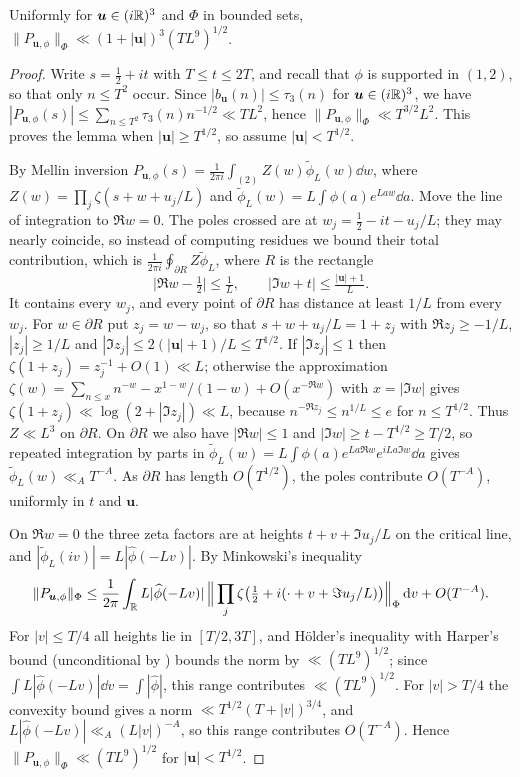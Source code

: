 \documentclass[11pt,colorlinks]{charlie}
\begin{document}
\begin{lemma}\label{lem:sourcenorm}
Uniformly for $\boldsymbol u\in(i\mathbb{R})^3$ and $\Phi$ in bounded sets, $\|P_{\boldsymbol u,\phi}\|_\Phi\ll(1+|\boldsymbol u|)^{3}(TL^9)^{1/2}$.
\end{lemma}
\begin{proof}
Write $s=\frac12+it$ with $T\le t\le2T$, and recall that $\phi$ is supported in $(1,2)$, so that only $n\le T^2$ occur. Since $|b_{\boldsymbol u}(n)|\le\tau_3(n)$ for $\boldsymbol u\in(i\mathbb{R})^3$, we have $|P_{\boldsymbol u,\phi}(s)|\le\sum_{n\le T^2}\tau_3(n)n^{-1/2}\ll TL^2$, hence $\|P_{\boldsymbol u,\phi}\|_\Phi\ll T^{3/2}L^2$. This proves the lemma when $|\boldsymbol u|\ge T^{1/2}$, so assume $|\boldsymbol u|<T^{1/2}$.

By Mellin inversion $P_{\boldsymbol u,\phi}(s)=\frac1{2\pi i}\int_{(2)}Z(w)\widetilde\phi_L(w)\dd w$, where $Z(w)=\prod_j\zeta(s+w+u_j/L)$ and $\widetilde\phi_L(w)=L\int\phi(a)e^{Law}\dd a$. Move the line of integration to $\Re w=0$. The poles crossed are at $w_j=\frac12-it-u_j/L$; they may nearly coincide, so instead of computing residues we bound their total contribution, which is $\frac1{2\pi i}\oint_{\partial R}Z\widetilde\phi_L$, where $R$ is the rectangle
\[
 \big|\Re w-\tfrac12\big|\le\tfrac1L,\qquad\big|\Im w+t\big|\le\tfrac{|\boldsymbol u|+1}L .
\]
It contains every $w_j$, and every point of $\partial R$ has distance at least $1/L$ from every $w_j$. For $w\in\partial R$ put $z_j=w-w_j$, so that $s+w+u_j/L=1+z_j$ with $\Re z_j\ge-1/L$, $|z_j|\ge1/L$ and $|\Im z_j|\le2(|\boldsymbol u|+1)/L\le T^{1/2}$. If $|\Im z_j|\le1$ then $\zeta(1+z_j)=z_j^{-1}+O(1)\ll L$; otherwise the approximation $\zeta(w)=\sum_{n\le x}n^{-w}-x^{1-w}/(1-w)+O(x^{-\Re w})$ with $x=|\Im w|$ \cite[Theorem~4.11]{Titchmarsh} gives $\zeta(1+z_j)\ll\log(2+|\Im z_j|)\ll L$, because $n^{-\Re z_j}\le n^{1/L}\le e$ for $n\le T^{1/2}$. Thus $Z\ll L^3$ on $\partial R$. On $\partial R$ we also have $|\Re w|\le1$ and $|\Im w|\ge t-T^{1/2}\ge T/2$, so repeated integration by parts in $\widetilde\phi_L(w)=L\int\phi(a)e^{La\Re w}e^{iLa\Im w}\dd a$ gives $\widetilde\phi_L(w)\ll_AT^{-A}$. As $\partial R$ has length $O(T^{1/2})$, the poles contribute $O(T^{-A})$, uniformly in $t$ and $\boldsymbol u$.

On $\Re w=0$ the three zeta factors are at heights $t+v+\Im u_j/L$ on the critical line, and $|\widetilde\phi_L(iv)|=L|\widehat\phi(-Lv)|$. By Minkowski's inequality
\[
 \|P_{\boldsymbol u,\phi}\|_\Phi\le\frac1{2\pi}\int_{\mathbb{R}} L|\widehat\phi(-Lv)|\,\Big\|\prod_j\zeta\big(\tfrac12+i(\cdot+v+\Im u_j/L)\big)\Big\|_\Phi\,\mathrm{d} v+O(T^{-A}).
\]
For $|v|\le T/4$ all heights lie in $[T/2,3T]$, and H\"older's inequality with Harper's bound \cite{Harper} (unconditional by \cite{Alpoge}) bounds the norm by $\ll(TL^9)^{1/2}$; since $\int L|\widehat\phi(-Lv)|\dd v=\int|\widehat\phi|$, this range contributes $\ll(TL^9)^{1/2}$. For $|v|>T/4$ the convexity bound gives a norm $\ll T^{1/2}(T+|v|)^{3/4}$, and $L|\widehat\phi(-Lv)|\ll_A(L|v|)^{-A}$, so this range contributes $O(T^{-A})$. Hence $\|P_{\boldsymbol u,\phi}\|_\Phi\ll(TL^9)^{1/2}$ for $|\boldsymbol u|<T^{1/2}$.
\end{proof}
\end{document}
